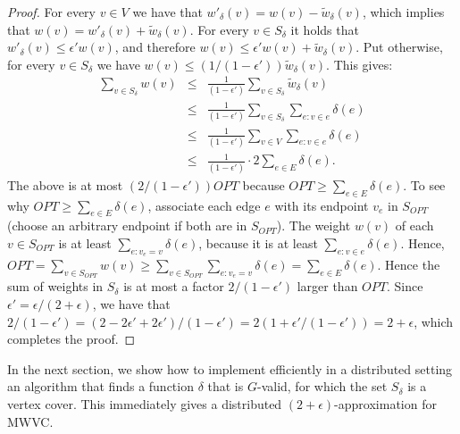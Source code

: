 \documentclass[11pt]{article}
\begin{document}
\begin{proof}
For every $v \in V$ we have that $w'_{\delta}(v)=w(v)-\tilde{w}_{\delta}(v)$, which implies that $w(v)=w'_{\delta}(v)+\tilde{w}_{\delta}(v)$. For every $v \in S_{\delta}$ it holds that $w'_{\delta}(v) \leq \epsilon' w(v)$, and therefore $w(v)\leq \epsilon' w(v)+\tilde{w}_{\delta}(v)$. Put otherwise, for every $v \in S_{\delta}$ we have $w(v)\leq (1/(1-\epsilon'))\tilde{w}_{\delta}(v)$. This gives:
\begin{eqnarray*}
\sum_{v \in S_{\delta}}{w(v)} &\leq& \frac{1}{(1-\epsilon')}\sum_{v \in S_{\delta}}{\tilde{w}_{\delta}(v)}\\
&\leq& \frac{1}{(1-\epsilon')}\sum_{v \in S_{\delta}}{\sum_{e: v \in e}{\delta(e)}} \\
&\leq& \frac{1}{(1-\epsilon')}\sum_{v \in V}{\sum_{e: v \in e}{\delta(e)}}\\
&\leq& \frac{1}{(1-\epsilon')} \cdot 2 \sum_{e \in E}{\delta(e)}.
\end{eqnarray*}
The above is at most $(2/(1-\epsilon')) OPT$ because $OPT \geq \sum_{e \in E}{\delta(e)}$. To see why $OPT \geq \sum_{e \in E}{\delta(e)}$, associate each edge $e$ with its endpoint $v_e$ in $S_{OPT}$ (choose an arbitrary endpoint if both are in $S_{OPT}$). The weight $w(v)$ of each $v \in S_{OPT}$ is at least $\sum_{e: v_e=v}{\delta(e)}$, because it is at least $\sum_{e: v \in e}{\delta(e)}$. Hence, $OPT = \sum_{v \in S_{OPT}}{w(v)} \geq \sum_{v \in S_{OPT}}{\sum_{e: v_e=v}{\delta(e)}} = \sum_{e \in E}{\delta(e)}$.
Hence the sum of weights in $S_{\delta}$ is at most a factor $2/(1-\epsilon')$ larger than $OPT$. Since $\epsilon'= \epsilon/(2+\epsilon)$, we have that $2/(1-\epsilon') = (2-2\epsilon'+2\epsilon')/(1-\epsilon') = 2(1 + \epsilon'/(1-\epsilon')) = 2 + \epsilon$, which completes the proof.
\end{proof}

In the next section, we show how to implement efficiently in a distributed setting an algorithm that finds a function $\delta$ that is $G$-valid, for which the set $S_{\delta}$ is a vertex cover. This immediately gives a distributed $(2+\epsilon)$-approximation for MWVC.
\end{document}
